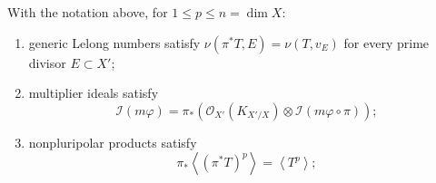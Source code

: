 \begin{proposition}\label{prop:functor-birational-pullback}
With the notation above, for $1\leq p\leq n=\dim X$:
\begin{enumerate}
\item generic Lelong numbers satisfy
      $\nu(\pi^*T,E)=\nu(T,v_E)$ for every prime divisor
      $E\subset X'$;
\item multiplier ideals satisfy
      \[
       \mathcal I(m\varphi)
       =
       \pi_*\!\left(
          \mathcal O_{X'}(K_{X'/X})
          \otimes\mathcal I(m\varphi\circ\pi)
       \right);
      \tag{67.3}\label{eq:functor-transformation-ideal}
      \]
\item nonpluripolar products satisfy
      \[
       \pi_*\left\langle(\pi^*T)^p\right\rangle
                   =\left\langle T^p\right\rangle;
      \tag{67.4}\label{eq:functor-npp-pullback}
      \]
\end{enumerate}
\par
\end{proposition}

